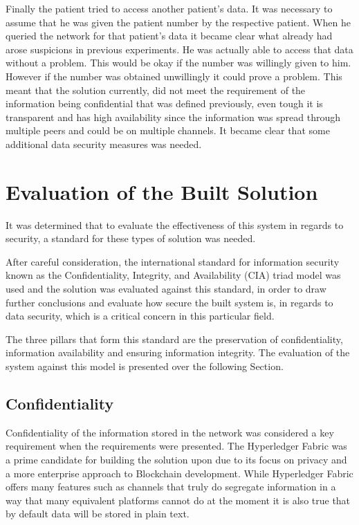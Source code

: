 Finally the patient tried to access another patient's data. It was necessary to
assume that he was given the patient number by the respective patient. When he
queried the network for that patient's data it became clear what already had
arose suspicions in previous experiments. He was actually able to access that
data without a problem. This would be okay if the number was willingly given to
him. However if the number was obtained unwillingly it could prove a problem.
This meant that the solution currently, did not meet the requirement of the
information being confidential that was defined previously, even tough it is
transparent and has high availability since the information was spread through
multiple peers and could be on multiple channels. It became clear that some
additional data security measures was needed.

\section{Evaluation of the Built Solution}

It was determined that to evaluate the effectiveness of this system in regards
to security, a standard for these types of solution was needed. 

After careful consideration, the international standard for information
security known as the Confidentiality, Integrity, and Availability (CIA) triad
model was used and the solution was evaluated against this standard, in order
to draw further conclusions and evaluate how secure the built system is, in
regards to data security, which is a critical concern in this particular field. 

The three pillars that form this standard are the preservation of
confidentiality, information availability and ensuring information integrity.
The evaluation of the system against this model is presented over the following
Section.

\subsection{Confidentiality}

Confidentiality of the information stored in the network was considered a key
requirement when the requirements were presented. The Hyperledger Fabric was a
prime candidate for building the solution upon due to its focus on privacy and
a more enterprise approach to Blockchain development. While Hyperledger Fabric
offers many features such as channels that truly do segregate information in a
way that many equivalent platforms cannot do at the moment it is also true that
by default data will be stored in plain text. 

